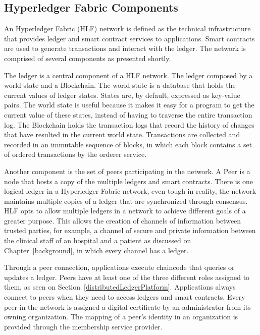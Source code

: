 \subsection{Hyperledger Fabric Components}

An Hyperledger Fabric (HLF) network is defined as the technical infrastructure
that provides ledger and smart contract services to applications. Smart
contracts are used to generate transactions and interact with the ledger. The
network is comprised of several components as presented shortly.

The ledger is a central component of a HLF network. The ledger composed by a
world state and a Blockchain. The world state is a database that holds the
current values of ledger states. States are, by default, expressed as key-value
pairs. The world state is useful because it makes it easy for a program to get
the current value of these states, instead of having to traverse the entire
transaction log. The Blockchain holds the transaction logs that record the
history of changes that have resulted in the current world state. Transactions
are collected and recorded in an immutable sequence of blocks, in which each
block contains a set of ordered transactions by the orderer service.

Another component is the set of peers participating in the network. A Peer is a
node that hosts a copy of the multiple ledgers and smart contracts. There is
one logical ledger in a Hyperledger Fabric network, even tough in reality, the
network maintains multiple copies of a ledger that are synchronized through
consensus. HLF opts to allow multiple ledgers in a network to achieve different
goals of a greater purpose. This allows the creation of channels of information
between trusted parties, for example, a channel of secure and private
information between the clinical staff of an hospital and a patient as
discussed on Chapter~\ref{background}, in which every channel has a ledger.

Through a peer connection, applications execute chaincode that queries or
updates a ledger. Peers have at least one of the three different roles assigned
to them, as seen on Section~\ref{distributedLedgerPlatform}. Applications
always connect to peers when they need to access ledgers and smart contracts.
Every peer in the network is assigned a digital certificate by an administrator
from its owning organization. The mapping of a peer's identity in an
organization is provided through the membership service provider. 

